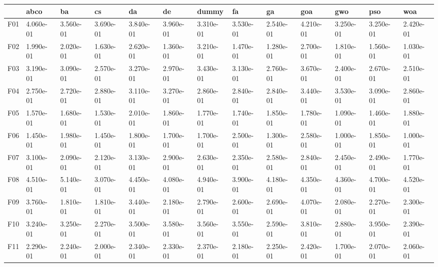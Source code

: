 \begin{table}
    \begin{adjustbox}{width=\linewidth}
        \begin{tabular}{lllllllllllll}
            \toprule
            {}   & abco      & ba        & cs        & da        & de        & dummy     & fa        & ga        & goa       & gwo       & pso       & woa       \\
            \midrule
            F01  & 4.060e-01 & 3.560e-01 & 3.690e-01 & 3.840e-01 & 3.960e-01 & 3.310e-01 & 3.530e-01 & 2.540e-01 & 4.210e-01 & 3.250e-01 & 3.250e-01 & 2.420e-01 \\
            F02  & 1.990e-01 & 2.020e-01 & 1.630e-01 & 2.620e-01 & 1.360e-01 & 3.210e-01 & 1.470e-01 & 1.280e-01 & 2.700e-01 & 1.810e-01 & 1.560e-01 & 1.030e-01 \\
            F03  & 3.190e-01 & 3.090e-01 & 2.570e-01 & 3.270e-01 & 2.970e-01 & 3.430e-01 & 3.130e-01 & 2.760e-01 & 3.670e-01 & 2.400e-01 & 2.670e-01 & 2.510e-01 \\
            F04  & 2.750e-01 & 2.720e-01 & 2.880e-01 & 3.110e-01 & 3.270e-01 & 2.860e-01 & 2.840e-01 & 2.840e-01 & 3.440e-01 & 3.530e-01 & 3.090e-01 & 2.860e-01 \\
            F05  & 1.570e-01 & 1.680e-01 & 1.530e-01 & 2.010e-01 & 1.860e-01 & 1.770e-01 & 1.740e-01 & 1.850e-01 & 1.780e-01 & 1.090e-01 & 1.460e-01 & 1.880e-01 \\
            F06  & 1.450e-01 & 1.980e-01 & 1.450e-01 & 1.800e-01 & 1.700e-01 & 1.700e-01 & 2.500e-01 & 1.300e-01 & 2.580e-01 & 1.000e-01 & 1.850e-01 & 1.000e-01 \\
            F07  & 3.100e-01 & 2.090e-01 & 2.120e-01 & 3.130e-01 & 2.900e-01 & 2.630e-01 & 2.350e-01 & 2.580e-01 & 2.840e-01 & 2.450e-01 & 2.490e-01 & 1.770e-01 \\
            F08  & 4.510e-01 & 5.140e-01 & 3.070e-01 & 4.450e-01 & 4.080e-01 & 4.940e-01 & 3.900e-01 & 4.180e-01 & 4.350e-01 & 4.360e-01 & 4.700e-01 & 4.520e-01 \\
            F09  & 3.760e-01 & 1.810e-01 & 1.810e-01 & 3.440e-01 & 2.180e-01 & 2.790e-01 & 2.600e-01 & 2.690e-01 & 4.070e-01 & 2.080e-01 & 2.270e-01 & 2.300e-01 \\
            F10  & 3.240e-01 & 3.250e-01 & 2.270e-01 & 3.500e-01 & 3.580e-01 & 3.560e-01 & 3.550e-01 & 2.590e-01 & 3.810e-01 & 2.880e-01 & 3.950e-01 & 2.390e-01 \\
            F11  & 2.290e-01 & 2.240e-01 & 2.000e-01 & 2.340e-01 & 2.330e-01 & 2.370e-01 & 2.180e-01 & 2.250e-01 & 2.420e-01 & 1.700e-01 & 2.070e-01 & 2.060e-01 \\

\end{tabular}
\end{adjustbox}
\end{table}
